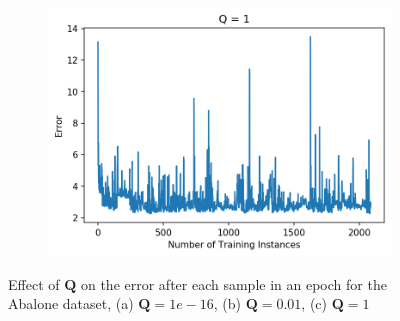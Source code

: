 \documentclass{article}
\begin{document}
\begin{figure}[ht]
    \begin{subfigure}[b]{0.5\linewidth}
        \includegraphics[width=\textwidth]{Q1.png}
        \caption{}
        \label{fig:Q1}
    \end{subfigure}%
    \caption{Effect of $\boldsymbol{Q}$ on the error after each sample in an epoch for the Abalone dataset, (a) $\boldsymbol{Q}=1e-16$, (b) $\boldsymbol{Q}=0.01$, (c) $\boldsymbol{Q}=1$}
    \label{fig:Q}
\end{figure}
\end{document}
